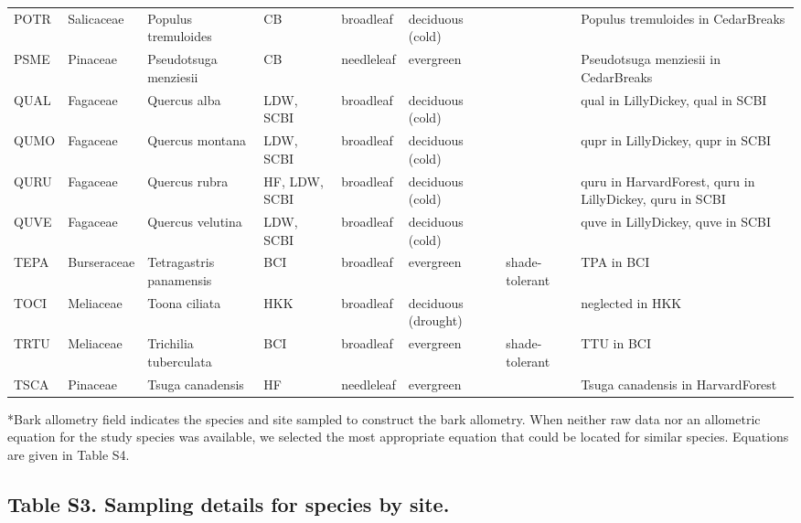 \documentclass[
]{article}
\begin{document}
\begin{table}[!h]
{\begin{tabular}{lllllll>{\raggedright\arraybackslash}p{5cm}}
\addlinespace
POTR & Salicaceae & Populus tremuloides & CB & broadleaf & deciduous (cold) &  & Populus tremuloides in CedarBreaks\\
\addlinespace
PSME & Pinaceae & Pseudotsuga menziesii & CB & needleleaf & evergreen &  & Pseudotsuga menziesii in CedarBreaks\\
\addlinespace
QUAL & Fagaceae & Quercus alba & LDW, SCBI & broadleaf & deciduous (cold) &  & qual in LillyDickey, qual in SCBI\\
\addlinespace
QUMO & Fagaceae & Quercus montana & LDW, SCBI & broadleaf & deciduous (cold) &  & qupr in LillyDickey, qupr in SCBI\\
\addlinespace
QURU & Fagaceae & Quercus rubra & HF, LDW, SCBI & broadleaf & deciduous (cold) &  & quru in HarvardForest, quru in LillyDickey, quru in SCBI\\
\addlinespace
QUVE & Fagaceae & Quercus velutina & LDW, SCBI & broadleaf & deciduous (cold) &  & quve in LillyDickey, quve in SCBI\\
\addlinespace
TEPA & Burseraceae & Tetragastris panamensis & BCI & broadleaf & evergreen & shade-tolerant & TPA in BCI\\
\addlinespace
TOCI & Meliaceae & Toona ciliata & HKK & broadleaf & deciduous (drought) &  & neglected in HKK\\
\addlinespace
TRTU & Meliaceae & Trichilia tuberculata & BCI & broadleaf & evergreen & shade-tolerant & TTU in BCI\\
\addlinespace
TSCA & Pinaceae & Tsuga canadensis & HF & needleleaf & evergreen &  & Tsuga canadensis in HarvardForest\\
\bottomrule
\end{tabular}}
\end{table}

*Bark allometry field indicates the species and site sampled to
construct the bark allometry. When neither raw data nor an allometric
equation for the study species was available, we selected the most
appropriate equation that could be located for similar species.
Equations are given in Table S4.

\newpage

\hypertarget{table-s3.-sampling-details-for-species-by-site.}{%
\subsection{Table S3. Sampling details for species by
site.}\label{table-s3.-sampling-details-for-species-by-site.}}
\end{document}

